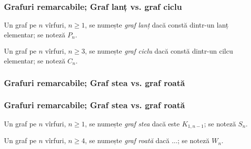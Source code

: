 \begin{frame}
  \frametitle{Grafuri remarcabile; Graf lanț vs. graf ciclu}

\begin{definition}
Un graf pe $n$ vîrfuri, $n\geq 1$, se numește \emph{graf lanț} dacă constă dintr-un lanț elementar; se noteză $P_n$. 
\end{definition}

\begin{definition}
Un graf pe $n$ vîrfuri, $n\geq 3$, se numește \emph{graf ciclu} dacă constă dintr-un cilcu elementar; se noteză $C_n$. 
\end{definition}

\end{frame}

\begin{frame}
  \frametitle{Grafuri remarcabile; Graf stea vs. graf roată}

\begin{figure}
\centering%
\end{figure}

\begin{figure}
\centering%
\end{figure}


\end{frame}

\begin{frame}
  \frametitle{Grafuri remarcabile; Graf stea vs. graf roată}

\begin{definition}
Un graf pe $n$ vîrfuri, $n\geq 1$, se numește \emph{graf stea} dacă este $K_{1,n-1}$; se noteză $S_n$. 
\end{definition}

\begin{definition}
Un graf pe $n$ vîrfuri, $n\geq 4$, se numește \emph{graf roată} dacă ...; se noteză $W_n$. 
\end{definition}

\end{frame}



